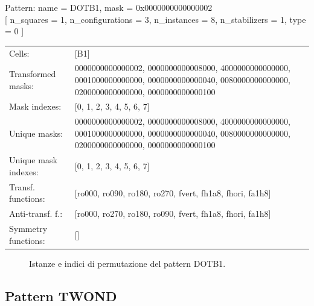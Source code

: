 \begin{tcolorbox}[sharp corners, fontupper=\ttfamily\small, colback=white]
  \noindent Pattern: name = DOTB1, mask = 0x0000000000000002\\
  {[} n\_squares = 1, n\_configurations = 3,
  n\_instances = 8, n\_stabilizers = 1, type = 0 { ]}\\[1.0ex]
  \begin{tabularx}{\textwidth}{@{} p{3.5cm} X @{}}
    Cells:               & {[}B1{]}\\[0.5ex]
    Transformed masks:   & 0000000000000002, 0000000000008000, 4000000000000000, 0001000000000000, 0000000000000040, 0080000000000000, 0200000000000000, 0000000000000100\\[0.5ex]
    Mask indexes:        & {[}0, 1, 2, 3, 4, 5, 6, 7{]}\\[0.5ex]
    Unique masks:        & 0000000000000002, 0000000000008000, 4000000000000000, 0001000000000000, 0000000000000040, 0080000000000000, 0200000000000000, 0000000000000100\\[0.5ex]
    Unique mask indexes: & {[}0, 1, 2, 3, 4, 5, 6, 7{]}\\[0.5ex]
    Transf. functions:   & {[}ro000, ro090, ro180, ro270, fvert, fh1a8, fhori, fa1h8{]}\\[0.5ex]
    Anti-transf. f.:     & {[}ro000, ro270, ro180, ro090, fvert, fh1a8, fhori, fa1h8{]}\\[0.5ex]
    Symmetry functions:  & {[}{]}\\[0.5ex]
  \end{tabularx}
\end{tcolorbox}

\begin{figure}[htbp]
  \centering
   \hfill
   \hfill
   \hfill
  \vspace{0.3cm}
   \hfill
   \hfill
   \hfill
  \caption{Istanze e indici di permutazione del pattern DOTB1.}
\end{figure}

\newpage

\subsection{Pattern TWOND}

